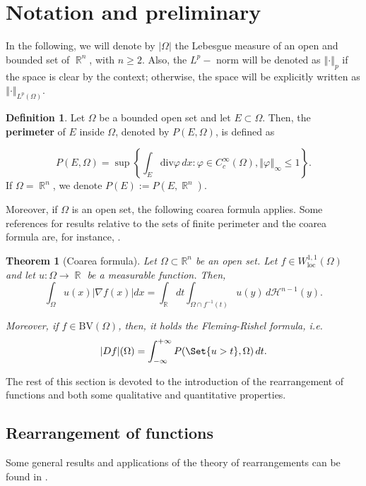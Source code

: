 \documentclass[oneside,a4paper,11pt,notitlepage]{article}
\newcommand{\abs}[1]{{\left|#1\right|}}
\newcommand{\norma}[1]{{\left\Vert#1\right\Vert}}
\theoremstyle{definition}
\newtheorem{definizione}{Definition}[section]
\theoremstyle{plain}
\newtheorem{theorem}{Theorem}[section]
\theoremstyle{definition}
\DeclareMathOperator{\R}{\mathbb{R}}
\begin{document}
\section{Notation and preliminary}
\label{section2}
In the following, we will denote by $\abs{\Omega}$ the Lebesgue measure of an open and bounded set of $\R^n$, with $n\geq2$. Also, the $ L^p-$ norm will be denoted as $\norma{\cdot}_p$ if the space is clear by the context; otherwise, the space will be explicitly written as $\norma{\cdot}_{L^p(\Omega)}$.
\begin{definizione}
    Let $\Omega$ be a bounded open set and let $ E\subset\Omega$. Then, the \textbf{perimeter} of $E$ inside $\Omega$, denoted by $P(E,\Omega)$, is defined as
   
    $$P(E,\Omega) = \sup\left\{ \int_E \text{div} \varphi \, dx : \varphi \in C_c^\infty(\Omega), \norma{\varphi}_{\infty} \leq 1\right\}.$$
    If $\Omega = \R^n$, we denote $P(E):=P(E,\R^n)$.
\end{definizione}
Moreover, if $\Omega$ is an open set, the following coarea formula applies. Some references for results relative to the sets of finite perimeter and the coarea formula are, for instance, \cite{AFP,Fleming_Rishel,maggi2012sets}.
\begin{theorem}[Coarea formula]
	Let $\Omega \subset \mathbb{R}^n$ be an open set. Let $f\in W^{1,1}_{\text{loc}}(\Omega)$ and let $u:\Omega\to\R$ be a measurable function. Then,
	\begin{equation}
        	\label{coarea}
		{\displaystyle \int _{\Omega}u(x)|\nabla f(x)|dx=\int _{\mathbb {R} }dt\int_{\Omega\cap f^{-1}(t)}u(y)\, d\mathcal {H}^{n-1}(y)}.
	\end{equation}

Moreover, if  $f \in \text{BV}(\Omega)$, then, it holds the Fleming-Rishel formula, i.e.
\begin{equation}
	 \label{flemingrishel}
	\abs{Df}(\Omega) = \int_{-\infty}^{+\infty} P(\Set{ u>t},\Omega ) \, dt.
\end{equation}
\end{theorem}

The rest of this section is devoted to the introduction of the rearrangement of functions and both some qualitative and quantitative properties. 
\subsection{Rearrangement of functions}
Some general results and applications of the theory of rearrangements can be found in \cite{K}.
\end{document}
